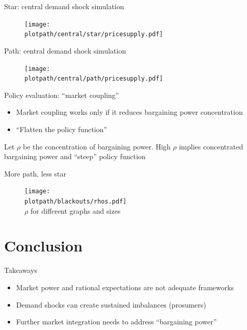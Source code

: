 \documentclass{beamer}
\newcommand{\plotpath}{../../plots}
\begin{document}
\begin{frame}{Star: central demand shock simulation}
    \begin{figure}[H]
        \centering
        \texttt{[image: \\plotpath/central/star/pricesupply.pdf]}
    \end{figure}

\end{frame}

\begin{frame} {Path: central demand shock simulation}
    \begin{figure}[H]
        \centering
        \texttt{[image: \\plotpath/central/path/pricesupply.pdf]}
    \end{figure}
\end{frame}

\begin{frame}{Policy evaluation: ``market coupling''}
    \begin{itemize}
        \item Market coupling works only if it reduces bargaining power concentration \pause
        \item ``Flatten the policy function'' \pause
    \end{itemize}

    Let $\rho$ be the concentration of bargaining power. High $\rho$ implies concentrated bargaining power and ``steep'' policy function
\end{frame}

\begin{frame}[allowframebreaks]{More path, less star}

    \centering
    \resizebox{0.7\textwidth}{!}{}



    \begin{figure}
        \texttt{[image: \\plotpath/blackouts/rhos.pdf]}
        \\ $\rho$ for different graphs and sizes
    \end{figure}

\end{frame}

\section{Conclusion}

\begin{frame}{Takeaways}
    \begin{itemize} \setlength\itemsep{1.5em}
        \item Market power and rational expectations are not adequate frameworks \pause
        \item Demand shocks can create sustained imbalances (prosumers) \pause
        \item Further market integration needs to address ``bargaining power''
    \end{itemize}
\end{frame}
\end{document}
